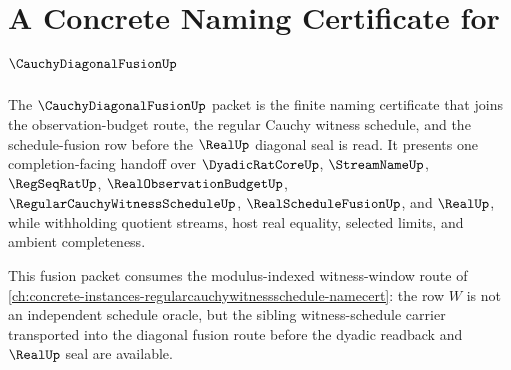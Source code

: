 \chapter{A Concrete Naming Certificate for $\CauchyDiagonalFusionUp$}
\label{ch:concrete-instances-cauchydiagonalfusion-namecert}

The $\CauchyDiagonalFusionUp$ packet is the finite naming certificate that joins the observation-budget route, the regular Cauchy witness schedule, and the schedule-fusion row before the $\RealUp$ diagonal seal is read. It presents one completion-facing handoff over $\DyadicRatCoreUp$, $\StreamNameUp$, $\RegSeqRatUp$, $\RealObservationBudgetUp$, $\RegularCauchyWitnessScheduleUp$, $\RealScheduleFusionUp$, and $\RealUp$, while withholding quotient streams, host real equality, selected limits, and ambient completeness.

This fusion packet consumes the modulus-indexed witness-window route of \autoref{ch:concrete-instances-regularcauchywitnessschedule-namecert}: the row $W$ is not an independent schedule oracle, but the sibling witness-schedule carrier transported into the diagonal fusion route before the dyadic readback and $\RealUp$ seal are available.

